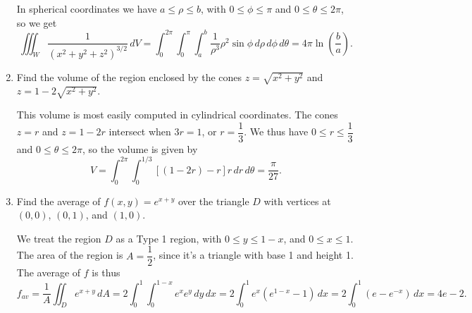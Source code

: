 \documentclass[letterpaper,12pt]{article}
\begin{document}
\begin{enumerate}
\bigskip

In spherical coordinates we have $a\leq\rho\leq b$, with $0\leq \phi\leq \pi$ and $0\leq \theta\leq 2\pi$, so we get
\[
 \iiint_W \frac{1}{(x^2+y^2+z^2)^{3/2}}\,dV = \int_0^{2\pi}\int_0^\pi\int_a^b \frac{1}{\rho^3}\rho^2\sin\phi \,d\rho\,d\phi\,d\theta  = 4\pi \ln\left(\frac{b}{a}\right).
\]

 \item Find the volume of the region enclosed by the cones $z=\sqrt{x^2+y^2}$ and $z=1-2\sqrt{x^2+y^2}$.

\bigskip

This volume is most easily computed in cylindrical coordinates. The cones $z=r$ and $z=1-2r$ intersect when $3r=1$, or $r=\dfrac{1}{3}$. We thus have $0\leq r\leq \dfrac{1}{3}$ and $0\leq \theta\leq 2\pi$, so the volume is given by
\[
 V = \int_0^{2\pi}\int_0^{1/3}[(1-2r)-r]r\,dr\,d\theta = \frac{\pi}{27}.
\]

 \item Find the average of $f(x,y)=e^{x+y}$ over the triangle $D$ with vertices at $(0,0)$, $(0,1)$, and $(1,0)$.

\bigskip

We treat the region $D$ as a Type 1 region, with $0\leq y\leq 1-x$, and $0\leq x\leq 1$. The area of the region is $A=\dfrac{1}{2}$, since it's a triangle with base 1 and height 1. The average of $f$ is thus
\[
 f_{av} = \frac{1}{A}\iint_D e^{x+y}\,dA = 2\int_0^1\int_0^{1-x}e^xe^y\,dy\,dx = 2\int_0^1 e^x(e^{1-x}-1)\,dx = 2\int_0^1 (e-e^{-x})\,dx = 4e-2.
\]

 \end{enumerate}
\end{document}
